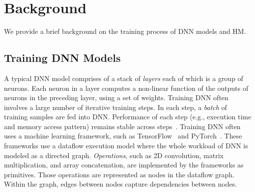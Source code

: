 \section{Background}
\label{sec:bg}

We provide a brief background on the training process of DNN models and HM. 

\subsection{Training DNN Models}
\label{sec:bg_training}

A typical DNN model comprises of a stack of \textit{layers} each of which is a group of neurons. Each neuron in a layer computes a non-linear function of the outputs of neurons in the preceding layer, using a set of weights. Training DNN often involves a large number of iterative training steps. In each step, a \textit{batch} of training samples are fed into DNN. Performance of each step (e.g., execution time and memory access pattern) remains stable across steps~\cite{liu:micro18,ipdps19_liu,DBLP:conf/asplos/SivathanuCSZ19}. %
Training DNN often uses a machine learning framework, such as TensorFlow~\cite{tensorflow2015-whitepaper} and  PyTorch~\cite{pytorch}. %
These frameworks use a dataflow execution model where the whole workload of DNN is modeled as a directed graph. 
\textit{Operations}, such as 2D convolution, matrix multiplication, and array concatenation, are implemented by the frameworks as primitives. Those operations are represented as nodes in the dataflow graph. Within the graph, edges between nodes capture dependencies between nodes. 



